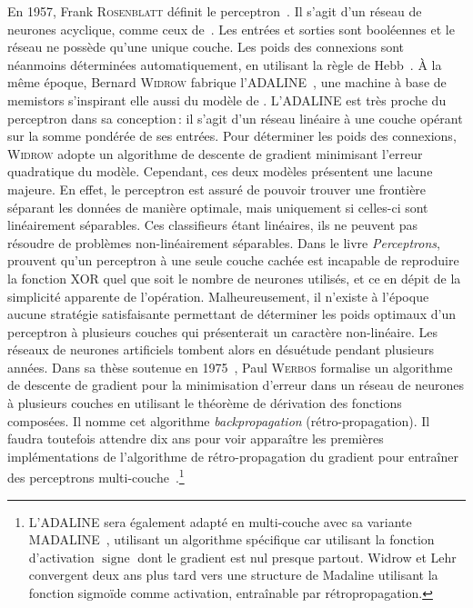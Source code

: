 En 1957, Frank \textsc{Rosenblatt} définit le perceptron~\cite{rosenblatt_perceptron_1957}. Il s'agit d'un réseau de neurones acyclique, comme ceux de~\citet{mcculloch_logical_1943}. Les entrées et sorties sont booléennes et le réseau ne possède qu'une unique couche. Les poids des connexions sont néanmoins déterminées automatiquement, en utilisant la règle de Hebb~\cite{hebb_organization_1949}.
À la même époque, Bernard \textsc{Widrow} fabrique l'ADALINE~\cite{widrow_adaptive_1960}, une machine à base de memistors s'inspirant elle aussi du modèle de \citeauthor{mcculloch_logical_1943}. L'ADALINE est très proche du perceptron dans sa conception\,: il s'agit d'un réseau linéaire à une couche opérant sur la somme pondérée de ses entrées. Pour déterminer les poids des connexions, \textsc{Widrow} adopte un algorithme de descente de gradient minimisant l'erreur quadratique du modèle.
Cependant, ces deux modèles présentent une lacune majeure. En effet, le perceptron est assuré de pouvoir trouver une frontière séparant les données de manière optimale, mais uniquement si celles-ci sont linéairement séparables. Ces classifieurs étant linéaires, ils ne peuvent pas résoudre de problèmes non-linéairement séparables. Dans le livre \emph{Perceptrons}, \citet{minsky_perceptrons_1969} prouvent qu'un perceptron à une seule couche cachée est incapable de reproduire la fonction XOR quel que soit le nombre de neurones utilisés, et ce en dépit de la simplicité apparente de l'opération. Malheureusement, il n'existe à l'époque aucune stratégie satisfaisante permettant de déterminer les poids optimaux d'un perceptron à plusieurs couches qui présenterait un caractère non-linéaire. Les réseaux de neurones artificiels tombent alors en désuétude pendant plusieurs années.
Dans sa thèse soutenue en 1975~\cite{werbos_beyond_1975}, Paul \textsc{Werbos} formalise un algorithme de descente de gradient pour la minimisation d'erreur dans un réseau de neurones à plusieurs couches en utilisant le théorème de dérivation des fonctions composées. Il nomme cet algorithme \emph{backpropagation} (rétro-propagation). Il faudra toutefois attendre dix ans pour voir apparaître les premières implémentations de l'algorithme de rétro-propagation du gradient pour entraîner des perceptrons multi-couche~\cite{rumelhart_learning_1986,lecun_learning_1986}.\footnote{L'ADALINE sera également adapté en multi-couche avec sa variante MADALINE~\cite{winter_madaline_1988}, utilisant un algorithme spécifique car utilisant la fonction d'activation $\operatorname{signe}$ dont le gradient est nul presque partout. Widrow et Lehr convergent deux ans plus tard vers une structure de Madaline utilisant la fonction sigmoïde comme activation, entraînable par rétropropagation.}


